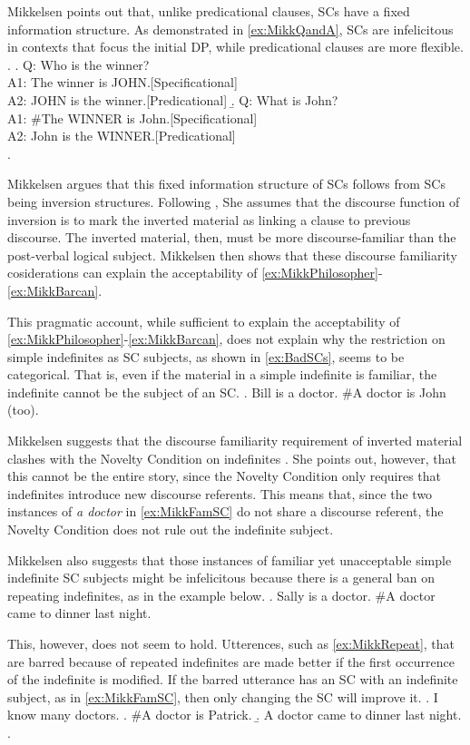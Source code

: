 \documentclass[GPFinal]{subfiles}
\begin{document}
Mikkelsen points out that, unlike predicational clauses, SCs have a fixed information structure.
As demonstrated in \ref{ex:MikkQandA}, SCs are infelicitous in contexts that focus the initial DP, while predicational clauses are more flexible.
\ex.\label{ex:MikkQandA}
\a. Q: Who is the winner?\\
A1: The winner is JOHN.\hfill[Specificational]\\
A2: JOHN is the winner.\hfill[Predicational]
\b. Q: What is John?\\
A1: \#The WINNER is John.\hfill[Specificational]\\
A2: John is the WINNER.\hfill[Predicational]\\
\z.

Mikkelsen argues that this fixed information structure of SCs follows from SCs being inversion structures.
Following \textcite{birner1994information,birner1996discourse}, She assumes that the discourse function of inversion is to mark the inverted material as linking a clause to previous discourse.
The inverted material, then, must be more discourse-familiar than the post-verbal logical subject.
Mikkelsen then shows that these discourse familiarity cosiderations can explain the acceptability of \ref{ex:MikkPhilosopher}-\ref{ex:MikkBarcan}.

This pragmatic account, while sufficient to explain the acceptability of \ref{ex:MikkPhilosopher}-\ref{ex:MikkBarcan}, does not explain why the restriction on simple indefinites as SC subjects, as shown in \ref{ex:BadSCs}, seems to be categorical.
That is, even if the material in a simple indefinite is familiar, the indefinite cannot be the subject of an SC.
\ex.\label{ex:MikkFamSC} Bill is a doctor. \#A doctor is John (too).

Mikkelsen suggests that the discourse familiarity requirement of inverted material clashes with the Novelty Condition on indefinites \parencite{heim1982semantics}.
She points out, however, that this cannot be the entire story, since the Novelty Condition only requires that indefinites introduce new discourse referents.
This means that, since the two instances of \textit{a doctor} in \ref{ex:MikkFamSC} do not share a discourse referent, the Novelty Condition does not rule out the indefinite subject.

Mikkelsen also suggests that those instances of familiar yet unacceptable simple indefinite SC subjects might be infelicitous because there is a general ban on repeating indefinites, as in the example below.
\ex.\label{ex:MikkRepeat} Sally is a doctor. \#A doctor came to dinner last night.

This, however, does not seem to hold.
Utterences, such as \ref{ex:MikkRepeat}, that are barred because of repeated indefinites are made better if the first occurrence of the indefinite is modified.
If the barred utterance has an SC with an indefinite subject, as in \ref{ex:MikkFamSC}, then only changing the SC will improve it.
\ex. I know many doctors.
  \a. \#A doctor is Patrick.
  \b. A doctor came to dinner last night.
  \z.
\end{document}

